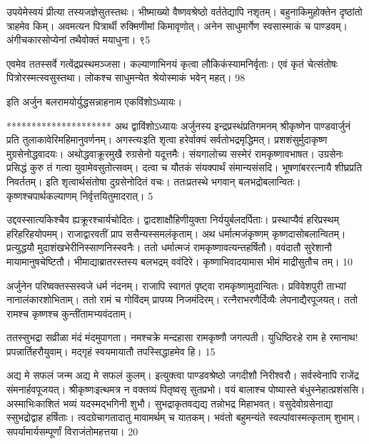 उपयेमेस्वयं प्रीत्या तस्यजज्ञेसुतस्तथः।
 भीष्माख्यो वैष्णवश्रेष्ठो वर्ततेद्यापि नशृतम्।
 बहुनाकिमुहोक्तेन दृष्ठांतो त्राहमेव किम्।
 अवमत्यन पित्रार्थी रुक्मिणीमां किमावृणोत्।
 अनेन साधुमार्गेण स्वसास्माकं च पाण्डवम्।
 अंगीचकारसोप्येनां तथैवोक्तं मयाधुना।
 ९5

  एवमेव ततस्सर्वे गत्वेंद्रप्रस्थमञ्जसा।
 कल्याणाभिनयं कृत्वा लौकिकंस्यामनिर्वृताः।
 एवं कृतं चेत्संतोषः पित्रोरस्मत्स्वसुस्तथा।
 लोकश्च साधुमन्येत श्रेयोस्माकं भवेन् महत्।
 98

  इति अर्जुन बलरामयोर्युद्धसन्नाहनाम
एकविंशोऽध्यायः।

*********************
अथ द्वाविंशोऽध्यायः अर्जुनस्य इन्द्रप्रस्थंप्रतिगमनम् श्रीकृष्णेन पाण्डवार्जुनं प्रति तुलाकावेरिमहिमानुवर्णनम्।
 अगस्त्यःइति शृत्वा हरेर्वाक्यं सर्वतोभद्रमृद्धिमत्।
 प्रशशंसुर्मुदाकृष्ण मुग्रसेनोद्धवादयः।
 अथोद्धवाक्रूरमुखै रुग्रसेनो यदूत्तमैः।
 संयगालोच्य सस्मेरं रामकृष्णावभाषत।
 उग्रसेनः
प्रसिद्धं कुरु तं गत्वा युवामेवसुतोत्सवम्।
 दत्वा च यौतकं संयक्पार्थं संमान्यसंसदि।
 भूषणांबररत्नायै शीघ्रप्रति निवर्ततम्।
 इति शृत्वार्थसंतोषा दुग्रसेनोदितं वचः।
 ततःप्रतस्थे भगवान् बलभद्रोबलान्वितः।
 कृष्णश्चपार्थकल्याणम् निर्वृत्तयितुमादरात्।
 5

  उद्दवस्सात्यकिश्चैव ह्यक्रूरश्चार्यचोदितः।
 द्वादशाक्षौहिणीयुक्ता निर्ययुर्बलदर्पिताः।
 प्रस्थाप्यैवं हरिप्रस्थम् हरिहरिहयोपमम्।
 राजाद्वारवतीं प्राप ससैन्यस्समलंकृताम्।
 अथ धर्मात्मजंकृष्णम् कृष्णदासोबलान्वितम्।
 प्रत्युद्धयौ मुदाशंखभेरीनिस्साणनिस्स्वनैः।
 ततो धर्मात्मजं रामकृष्णावत्यन्तहर्षितौ।
 ववंदातौ सुरेशानौ मायामानुषचेष्टितौ।
 भीमाद्याब्रातरस्तस्य बलभद्रम् ववंदिरे।
 कृष्णाभिवादयामास भीमं माद्रीसुतौच तम्।
 10

  अर्जुनेन परिष्वक्तस्सस्वजे धर्म नंदनम्।
 राजापि स्वागतं पृष्ट्वा रामकृष्णामुदान्वितः।
 प्रविवेशपुरी ताभ्यां नानालंकारशोभिताम्।
 ततो रामं च गोविंदम् प्रापय्य निजमंदिरम्।
 रत्नैराभरणैर्दिव्यैः लेपनाद्यैरपूजयत्।
 ततो रामश्च कृष्णश्च कुन्तींतामभ्यवंदताम्।
 
ततस्सुभद्रा सव्रीळा मंदं मंदमुपागता।
 नमश्चक्रे मन्दहासा रामकृष्णौ जगत्पती।
 युधिष्ठिरःहे राम हे रमानाथ! प्रपन्नार्तिहरौयुवाम्।
 मद्गृहं स्वयमायातौ तपस्सिद्धाहमेव हि।
 15

  अद्य मे सफलं जन्म अद्य मे सफलं कुलम्।
 इत्युक्त्वा पाण्डवश्रेष्ठो जगदीशौ निरीश्वरौ।
 सर्वस्वेनापि राजेंद्र संमनार्हवपूजयत्।
 श्रीकृष्णःइत्थमत्र न वक्तव्यं पितृष्वसृ सुतप्रभो।
 वयं बालाश्च पोष्यास्ते बंधुस्नेहात्प्रशंससि।
 अस्माभिःकाशितं भव्यं यदस्मद्भगिनी शुभौ।
 सुभद्राकृतवद्यद्य तन्नोभद्र मिहाभवत्।
 वसुदेवोग्रसेनाद्या स्सुभद्रोद्वाह हर्षिताः।
 त्वदग्रेचागतादातु मावामर्थम् च यातकम्।
 भवंतो बहुमन्यंते स्वल्पांवास्मत्कृताम् शुभाम्।
 सपर्यामार्यसम्पूर्णां विराजंतोमहत्तया।
 20

